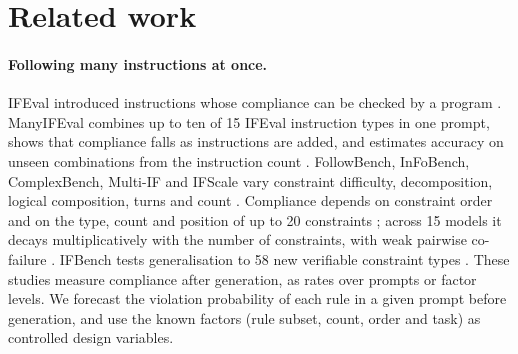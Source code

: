 \documentclass{article}
\begin{document}
\section{Related work}
\label{sec:related}

\paragraph{Following many instructions at once.} IFEval introduced instructions whose compliance can be checked by a
program \citep{zhou2023ifeval}. ManyIFEval combines up to ten of 15 IFEval instruction types in one prompt, shows that
compliance falls as instructions are added, and estimates accuracy on unseen combinations from the instruction count
\citep{harada2025instructions}. FollowBench, InFoBench, ComplexBench, Multi-IF and IFScale vary constraint difficulty,
decomposition, logical composition, turns and count
\citep{jiang2024followbench,qin2024infobench,wen2024complexbench,he2024multiif,jaroslawicz2025many}. Compliance
depends on constraint order \citep{zeng2025order} and on the type, count and position of up to 20 constraints
\citep{purpura2026mosaic}; across 15 models it decays multiplicatively with the number of constraints, with weak
pairwise co-failure \citep{vasileva2026cse}. IFBench tests generalisation to 58
new verifiable constraint types \citep{pyatkin2025ifbench}. These studies measure compliance after generation, as
rates over prompts or factor levels. We forecast the violation probability of each rule in a given prompt before
generation, and use the known factors (rule subset, count, order and task) as controlled design variables.
\end{document}
